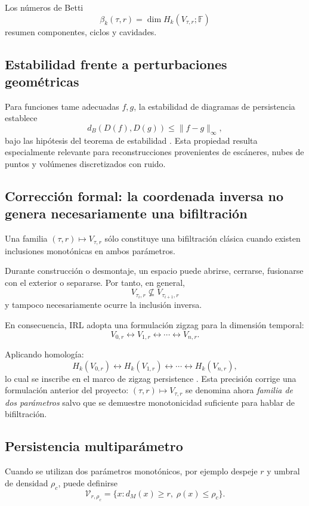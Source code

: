 Los números de Betti
\[
\beta_k(\tau,r)
=
\dim H_k(V_{\tau,r};\mathbb F)
\]
resumen componentes, ciclos y cavidades.

\subsection{Estabilidad frente a perturbaciones geométricas}

Para funciones tame adecuadas \(f,g\), la estabilidad de diagramas de persistencia establece
\[
\boxed{
d_B(D(f),D(g))
\le
\|f-g\|_\infty,
}
\]
bajo las hipótesis del teorema de estabilidad \cite{cohensteiner2007}. Esta propiedad resulta especialmente relevante para reconstrucciones provenientes de escáneres, nubes de puntos y volúmenes discretizados con ruido.

\subsection{Corrección formal: la coordenada inversa no genera necesariamente una bifiltración}

Una familia \((\tau,r)\mapsto V_{\tau,r}\) sólo constituye una bifiltración clásica cuando existen inclusiones monotónicas en ambos parámetros.

Durante construcción o desmontaje, un espacio puede abrirse, cerrarse, fusionarse con el exterior o separarse. Por tanto, en general,
\[
V_{\tau_i,r}
\nsubseteq
V_{\tau_{i+1},r}
\]
y tampoco necesariamente ocurre la inclusión inversa.

En consecuencia, IRL adopta una formulación zigzag para la dimensión temporal:
\[
\boxed{
V_{0,r}
\leftrightarrow
V_{1,r}
\leftrightarrow
\cdots
\leftrightarrow
V_{n,r}.
}
\]

Aplicando homología:
\[
H_k(V_{0,r})
\leftrightarrow
H_k(V_{1,r})
\leftrightarrow
\cdots
\leftrightarrow
H_k(V_{n,r}),
\]
lo cual se inscribe en el marco de zigzag persistence \cite{carlssondesilva2010}. Esta precisión corrige una formulación anterior del proyecto: \((\tau,r)\mapsto V_{\tau,r}\) se denomina ahora \emph{familia de dos parámetros} salvo que se demuestre monotonicidad suficiente para hablar de bifiltración.

\subsection{Persistencia multiparámetro}

Cuando se utilizan dos parámetros monotónicos, por ejemplo despeje \(r\) y umbral de densidad \(\rho_c\), puede definirse
\[
\mathcal V_{r,\rho_c}
=
\{
x:
d_M(x)\ge r,\;
\rho(x)\le\rho_c
\}.
\]

